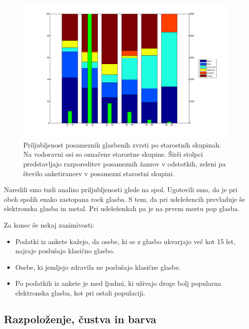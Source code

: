\documentclass[a4paper, 12pt]{book}
\begin{document}
{\begin{figure}[hbt]
\centering
\includegraphics[width=15cm]{images/genretop1.png}

\caption{Priljubljenost posameznih glasbenih zvrsti po starostnih skupinah. Na vodoravni osi so označene starostne skupine. Širši stolpci predstavljajo razporeditev posameznih žanrov v odstotkih, zeleni pa število anketirancev v posamezni starostni skupini.  }
\label{zanrigraftop}
\end{figure}

Naredili smo tudi analizo priljubljenosti glede na spol. Ugotovili smo, da je pri obeh spolih enako zastopana rock glasba. S tem, da pri udeležencih prevladuje še elektronska glasba in metal. Pri udeleženkah pa je na prvem mestu pop glasba. 

Za konec še nekaj zanimivosti:
\begin{itemize}
\item Podatki iz ankete kažejo, da osebe, ki se z glasbo ukvarjajo več kot 15 let, najraje poslušajo klasično glasbo.
\item Osebe, ki jemljejo zdravila ne poslušajo klasične glasbe.
\item Po podatkih iz ankete je med ljudmi, ki uživajo droge bolj popularna elektronska glasba, kot pri ostali populaciji.
\end{itemize}

\subsection{Razpoloženje, čustva in barva}

}
\end{document}
